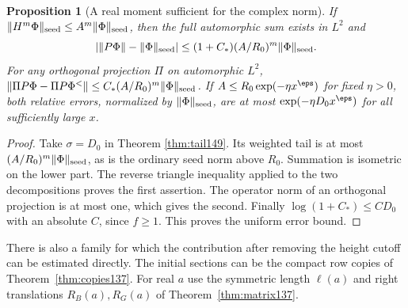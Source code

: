 \documentclass[a4paper,11pt]{article}
\newtheorem{proposition}{Proposition}[section]
\theoremstyle{definition}
\theoremstyle{remark}
\numberwithin{equation}{section}
\begin{document}
\begin{proposition}[A real moment sufficient for the complex norm]
\label{prop:mom150}
If \(\|H^m\Phi\|_{\rm seed}\le A^m\|\Phi\|_{\rm seed}\), then
the full automorphic sum exists in \(L^2\) and
\[
  \left|\|P\Phi\|-\|\Phi\|_{\rm seed}\right|
          \le (1+C_*)(A/R_0)^m\|\Phi\|_{\rm seed}.
\]
For any orthogonal projection \(\Pi\) on automorphic \(L^2\),
\(\|\Pi P\Phi-\Pi P\Phi^{<}\|
\le C_*(A/R_0)^m\|\Phi\|_{\rm seed}\).
If \(A\le R_0\exp(-\eta x^\eps)\) for fixed \(\eta>0\),
both relative errors, normalized by \(\|\Phi\|_{\rm seed}\),
are at most \(\exp(-\eta D_0 x^\eps)\) for all sufficiently
large \(x\).
\end{proposition}
\begin{proof}
Take \(\sigma=D_0\) in Theorem \ref{thm:tail149}. Its weighted
tail is at most \((A/R_0)^m\|\Phi\|_{\rm seed}\), as is the
ordinary seed norm above \(R_0\). Summation is isometric on the
lower part. The reverse triangle inequality applied to the
two decompositions proves the first assertion. The operator
norm of an orthogonal projection is at most one, which gives
the second. Finally \(\log(1+C_*)\le C D_0\) with an absolute
\(C\), since \(f\ge1\). This proves the uniform error bound.
\end{proof}

There is also a family for which the contribution after
removing the height cutoff can be estimated directly. The
initial sections can be the compact row copies of
Theorem~\ref{thm:copies137}. For real \(a\) use the symmetric
length \(\ell(a)\) and right translations \(R_B(a),R_G(a)\)
of Theorem~\ref{thm:matrix137}.
\end{document}
